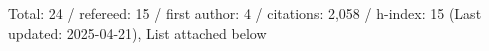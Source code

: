 Total: 24 / refereed: 15 / first author: 4 / citations: 2,058 / h-index: 15 (Last updated: 2025-04-21), List attached below
